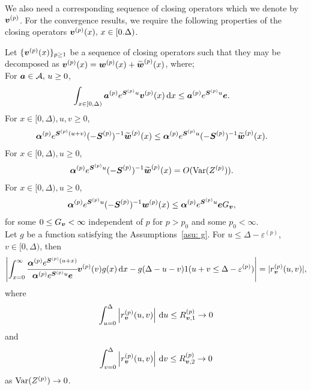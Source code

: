We also need a corresponding sequence of closing operators which we denote by \({\boldsymbol v}^{(p)}\). For the convergence results, we require the following properties of the closing operators \({\boldsymbol v}^{(p)}(x),\, x \in[0.\Delta)\).
\begin{property}\label{properties: some props}
	Let \(\{\boldsymbol v^{(p)}(x)\}_{p\geq 1}\) be a sequence of closing operators such that they may be decomposed as \(\boldsymbol v^{(p)}(x)=\boldsymbol w^{(p)}(x) + \widetilde{\boldsymbol w}^{(p)}(x)\), where; \\
	\subproperty \label{properties: -2} For \(\boldsymbol a \in\mathcal A,\,u\geq 0\),  
        \begin{align*}
        		\int_{x\in[0,\Delta)}\boldsymbol a^{(p)} e^{\boldsymbol S^{(p)}u} {\boldsymbol v}^{(p)}(x) \, \mathrm{d} x&\leq \boldsymbol a^{(p)} e^{\boldsymbol S^{(p)}u} \boldsymbol e.
		\end{align*}
	\subproperty \label{properties: -1} For \(x\in[0,\Delta),u,v\geq 0\),  
        \begin{align*}
        		\boldsymbol \alpha^{(p)} e^{\boldsymbol S^{(p)}(u+v)}(-\boldsymbol S^{(p)})^{-1} \widetilde{\boldsymbol w}^{(p)}(x) &\leq \boldsymbol \alpha^{(p)} e^{\boldsymbol S^{(p)}u}(-\boldsymbol S^{(p)})^{-1} \widetilde{\boldsymbol w}^{(p)}(x).
		\end{align*}
	\subproperty \label{properties: 0} For \(x\in[0,\Delta),u\geq 0\),
		\begin{align*}
			\boldsymbol \alpha^{(p)} e^{\boldsymbol S^{(p)}u}(-\boldsymbol S^{(p)})^{-1} \widetilde{\boldsymbol w}^{(p)}(x) &=O(\mathrm{Var}(Z^{(p)})). 
		\end{align*}
	\subproperty \label{properties: 1} For \(x\in[0,\Delta),u\geq 0\),  
        \begin{align*}
        		\boldsymbol \alpha^{(p)} e^{\boldsymbol S^{(p)}u}(-\boldsymbol S^{(p)})^{-1} \boldsymbol w^{(p)}(x) &\leq \boldsymbol \alpha^{(p)} e^{\boldsymbol S^{(p)}u} \boldsymbol e G_{\boldsymbol v},
	\end{align*}
	for some \(0\leq G_{\boldsymbol v}<\infty\) independent of \(p\) for \(p>p_0\) and some \(p_0<\infty\). \\
	\subproperty \label{properties: 2} Let \(g\) be a function satisfying the Assumptions~\ref{asu: g}. For \(u\leq \Delta-\varepsilon^{(p)}\), \(v\in[0,\Delta)\), then
	\[\left|\int_{x=0}^\infty \cfrac{\boldsymbol \alpha^{(p)} e^{\boldsymbol{S}^{(p)}(u+x)} }{\boldsymbol \alpha^{(p)} e^{\boldsymbol{S}^{(p)}u} \boldsymbol e} {\boldsymbol v}^{(p)}(v)g(x)\, \mathrm{d} x -g(\Delta-u-v) 1(u+v\leq\Delta-\varepsilon^{(p)})\right| =  |r_{\boldsymbol v}^{(p)}(u,v)|,\]
	where 
	\[ \int_{u=0}^{\Delta}\left| r_{\boldsymbol v}^{(p)}(u,v)\right| \, \mathrm{d} u  \leq R_{{\boldsymbol v},1}^{(p)} \to 0\]
	and 
	\[ \int_{v=0}^{\Delta}\left| r_{\boldsymbol v}^{(p)}(u,v)\right| \, \mathrm{d} v  \leq R_{{\boldsymbol v},2}^{(p)} \to 0\]
	as \(\mathrm{Var}(Z^{(p)})\to 0\). 
\end{property}

